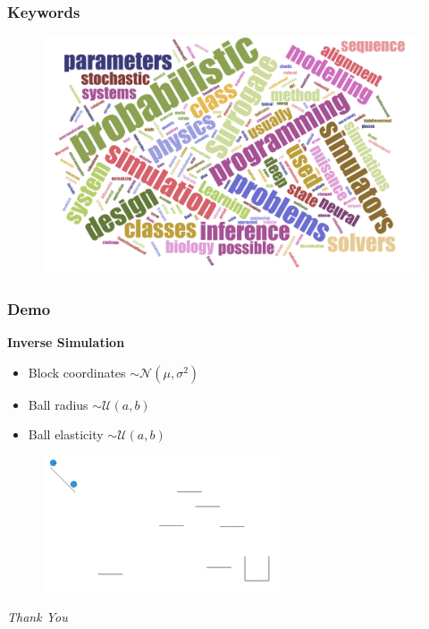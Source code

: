 \documentclass{beamer}              %
\begin{document}

\begin{frame}
  \frametitle{Keywords}
     \begin{figure}
       \includegraphics[width=\textwidth]{wordcloud.png}
   \end{figure}
\end{frame}



\begin{frame}
  \frametitle{Demo}
    \textbf{Inverse Simulation}
    \begin{itemize}
      \item <1-> Block coordinates $\sim \mathcal{N}(\mu, \sigma^2)$
      \item <2-> Ball radius $\sim \mathcal{U}(a, b)$
      \item <3-> Ball elasticity $\sim \mathcal{U}(a, b)$
    \end{itemize}
     \begin{figure}
       \href{https://www.youtube.com/watch?v=sVuu3UZmL3w&feature=youtu.be}
          {\includegraphics[height=4cm]{shot1.jpg}}
   \end{figure}
\end{frame}


\begin{frame}
  \centering \Huge
  \emph{Thank You}
\end{frame}
\end{document}
